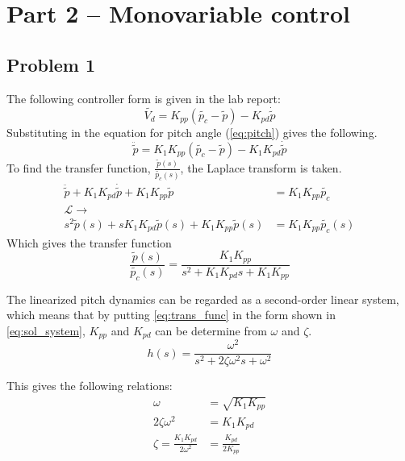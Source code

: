 
\section{Part 2 -- Monovariable control}
\subsection{Problem 1}
The following controller form is given in the lab report:
\begin{equation}
  \label{eq:pd_controller}
  \tilde{V_d} = K_{pp}(\tilde{p_c} - \tilde{p}) - K_{pd} \dot{\tilde{p}}
\end {equation}
Substituting in the equation for pitch
angle (\cref{eq:pitch}) gives the following.
\begin{equation}
  \label{eq:pitch_with_pd}
  \ddot{\tilde{p}} = K_1 K_{pp}(\tilde{p_c} - \tilde{p}) - K_1 K_{pd}
  \dot{\tilde{p}}
\end{equation}
To find the transfer
function, $\frac{\tilde{p}(s)}{\tilde{p_c}(s)}$, the Laplace transform is taken.
\begin{align*}
  \ddot{\tilde{p}} + K_1 K_{pd}\dot{\tilde{p}}
  + K_1K_{pp}\tilde{p} &= K_1 K_{pp}\tilde{p_c} \\
  \mathcal{L}\rightarrow&  \\
  s^2\tilde{p}(s) + sK_1K_{pd}\tilde{p}(s)
  + K_1K_{pp}\tilde{p}(s) &= K_1K_{pp}\tilde{p_c}(s)
\end{align*}
Which gives the transfer function
\begin{equation}
  \label{eq:trans_func}
  \frac{\tilde{p}(s)}{\tilde{p_c}(s)} = \frac{K_1K_{pp}}{s^2+K_1K_{pd}s+K_1K_{pp}}
\end{equation}

The linearized pitch dynamics can be regarded as a second-order linear
system, which means that by putting \cref{eq:trans_func} in the form
shown in \cref{eq:sol_system}, $K_{pp}$ and $K_{pd}$ can be determine
from $\omega$ and $\zeta$.
\begin{equation}
  \label{eq:sol_system}
  h(s) = \frac{\omega^2}{s^2+2\zeta\omega^2s+\omega^2}
\end{equation}

This gives the following relations:
\begin{align}
  \label{eq:omega}
  \omega &= \sqrt{K_ 1K_ {pp}} \\
  2\zeta\omega^2 &= K_ 1K_ {pd} \nonumber \\
  \label{eq:zeta}
  \zeta = \frac{K_ 1K_ {pd}}{2\omega^2} &= \frac{K_{pd}}{2K_{pp}}
\end{align}

